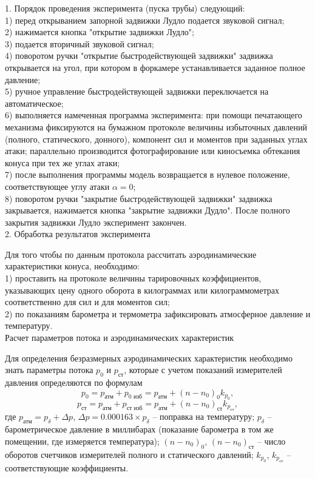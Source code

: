 \documentclass[specialist, subf, href, colorlinks=true, 14pt, final]{disser}
\theoremstyle{definition}
\begin{document}
1. Порядок проведения эксперимента (пуска трубы) следующий:\\
1) перед открыванием запорной задвижки Лудло подается звуковой сигнал;\\
2) нажимается кнопка "открытие задвижки Лудло";\\
3) подается вторичный звуковой сигнал;\\
4) поворотом ручки "открытие быстродействующей задвижки"{} задвижка открывается на угол, при котором в форкамере устанавливается заданное полное давление;\\
5) ручное управление быстродействующей задвижки переключается на автоматическое;\\
6) выполняется намеченная программа эксперимента: при помощи печатающего механизма фиксируются на бумажном протоколе величины избыточных давлений (полного, статического, донного), компонент сил и моментов при заданных углах атаки; параллельно производится фотографирование или киносъемка обтекания конуса при тех же углах атаки;\\
7) после выполнения программы модель возвращается в нулевое положение, соответствующее углу атаки $\alpha = 0$;\\
8) поворотом ручки "закрытие быстродействующей задвижки"{} задвижка закрывается, нажимается кнопка "закрытие задвижки Дудло". После полного закрытия задвижки Лудло эксперимент закончен.\\

2. Обработка результатов эксперимента

Для того чтобы по данным протокола рассчитать аэродинамические характеристики конуса, необходимо:\\
1) проставить на протоколе величины тарировочных коэффициентов, указывающих цену одного оборота в килограммах или килограммометрах соответственно для сил и для моментов сил;\\
2) по показаниям барометра и термометра зафиксировать атмосферное давление и температуру.\\

Расчет параметров потока и аэродинамических характеристик

Для определения безразмерных аэродинамических характеристик необходимо знать параметры потока $p_0$ и $p_{\text{ст}}$, которые с учетом показаний измерителей давления определяются по формулам
\[ p_0 = p_{\text{атм}} + p_{\text{0 изб}} = p_{\text{атм}} + (n - n_0)_0k_{p_0},\]
\[ p_{\text{ст}} = p_{\text{атм}} + p_{\text{ст изб}} = p_{\text{атм}} + (n - n_0)_{\text{ст}}k_{p_{\text{ст}}},\]
где $p_{\text{атм}} = p_{\delta} + \Delta p$, $\Delta p = 0.000163 \times p_{\delta}$ -- поправка на температуру; $p_\delta$ -- барометрическое давление в миллибарах (показание барометра в том же
помещении, где измеряется температура); $(n-n_{0})_0$, $(n-n_{0})_{\text{ст}}$ -- число оборотов счетчиков измерителей полного и статического давлений; $k_{p_{0}}$, $k_{p_{\text{ст}}}$ -- соответствующие коэффициенты.
\end{document}
